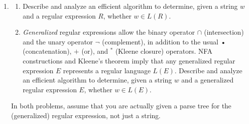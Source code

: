 \begin{enumerate}[label=\arabic*.,ref=\thechapter.\arabic*,leftmargin=*,align=left,widest*=99,itemsep=1.5ex plus 0.5ex,resume]
\begin{enumerate}
\item A \textit{gap} in a secondary structure is a maximal substring of unpaired bases.
Large gaps lead to chemical instabilities, so secondary structures with smaller gaps are more likely.
To account for this preference, let’s define the \textit{score} of a secondary structure to be the sum of the \textit{squares} of the gap lengths; see Figure 3.8.
(This score function is utterly fictional; real RNA structure prediction requires \textit{much} more complicated scoring functions.)
Describe and analyze an algorithm that computes the minimum possible score of a secondary structure for a given RNA sequence.
\end{enumerate}
\item {}
\begin{enumerate}
\item Describe and analyze an efficient algorithm to determine, given a string $w$ and a regular expression $R$, whether $w\in L(R)$.
\item \textit{Generalized} regular expressions allow the binary operator $\cap$ (intersection) and the unary operator $\neg$ (complement), in addition to the usual • (concatenation), $+$ (or), and $^*$ (Kleene closure) operators.
NFA constructions and Kleene’s theorem imply that any generalized regular expression $E$ represents a regular language $L(E)$.
Describe and analyze an efficient algorithm to determine, given a string $w$ and a generalized regular expression $E$, whether $w\in L(E)$.
\end{enumerate}
In both problems, assume that you are actually given a parse tree for the (generalized) regular expression, not just a string.
\end{enumerate}
